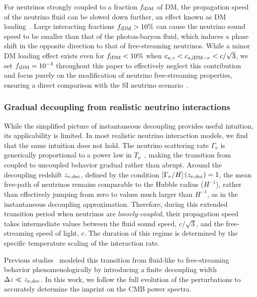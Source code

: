 For neutrinos strongly coupled to a fraction $f_{\rm iDM}$ of DM, the propagation speed of the neutrino fluid can be slowed down further, an effect known as DM loading~\cite{Ghosh:2024wva}. Large interacting fractions $f_{\rm iDM} > 10\%$ can cause the neutrino sound speed to be smaller than that of the photon-baryon fluid, which induces a phase shift in the opposite direction to that of free-streaming neutrinos.
While a minor DM loading effect exists even for $f_{\rm iDM} < 10\%$ when $c_{s,\gamma}<c_{s,\rm iDM-\nu}<c/\sqrt{3}$, we set $f_{\rm iDM} = 10^{-3}$ throughout this paper to effectively neglect this contribution and focus purely on the modification of neutrino free-streaming properties, ensuring a direct comparison with the SI neutrino scenario~\cite{Ghosh:2017jdy,Ghosh:2019tab,Ghosh:2024wva}.


\subsubsection{Gradual decoupling from realistic neutrino interactions}\label{sec:ch13-3.2}

\noindent While the simplified picture of instantaneous decoupling provides useful intuition, its applicability is limited. In most realistic neutrino interaction models, we find that the same intuition does not hold.  The neutrino scattering rate $\Gamma_\nu$ is generically proportional to a power law in $T_\nu$~\cite{Boehm:2003hm,Stadler:2019dii}, making the transition from coupled to uncoupled behavior gradual rather than abrupt. Around the decoupling redshift $z_{\nu,\rm dec}$, defined by the condition
$\left[\Gamma_\nu/H\right](z_{\nu,\rm dec})=1$, the mean free-path of neutrinos remains comparable to the Hubble radius ($H^{-1}$), rather than effectively jumping from zero to values much larger than $H^{-1}$, as in the instantaneous decoupling approximation. Therefore, during this extended transition period when neutrinos are \textit{loosely-coupled}, their propagation speed takes intermediate values between the fluid sound speed, $c/\sqrt{3}$, and the free-streaming speed of light, $c$. The duration of this regime is determined by the specific temperature scaling of the interaction rate.

Previous studies~\cite{Choi:2018gho,Loverde:2022wih} modeled this transition from fluid-like to free-streaming behavior phenomenologically by introducing a finite decoupling width $\Delta z \ll z_{\nu,\rm dec}$. In this work, we follow the full evolution of the perturbations to accurately determine the imprint on the CMB power spectra.

